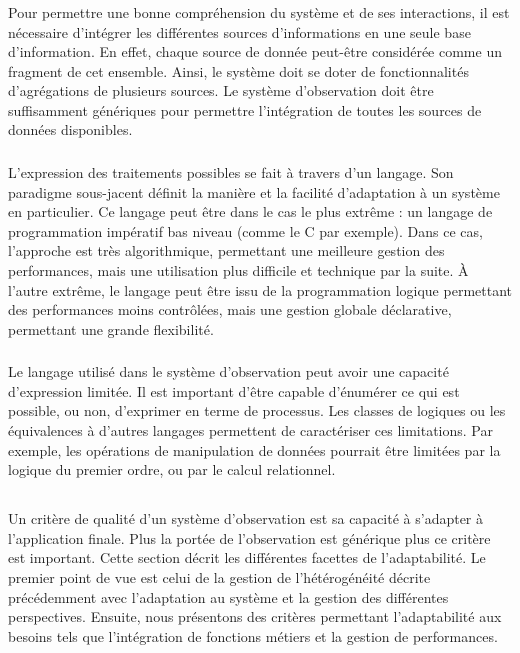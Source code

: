 \subsubsection{\critereBB}
Pour permettre une bonne compréhension du système et de ses interactions, il est nécessaire d'intégrer les différentes sources d'informations en une seule base d'information. En effet, chaque source de donnée peut-être considérée comme un fragment de cet ensemble. Ainsi, le système doit se doter de fonctionnalités d'agrégations de plusieurs sources. Le système d'observation doit être suffisamment génériques pour permettre l'intégration de toutes les sources de données disponibles.

\subsubsection{\critereBC}
L'expression des traitements possibles se fait à travers d'un langage. Son paradigme sous-jacent définit la manière et la facilité d'adaptation à un système en particulier. Ce langage peut être dans le cas le plus extrême : un langage de programmation impératif bas niveau (comme le C par exemple). Dans ce cas, l'approche est très algorithmique, permettant une meilleure gestion des performances, mais une utilisation plus difficile et technique par la suite. À l'autre extrême, le langage peut être issu de la programmation logique permettant des performances moins contrôlées, mais une gestion globale déclarative, permettant une grande flexibilité.

\subsubsection{\critereBD}
Le langage utilisé dans le système d'observation peut avoir une capacité d'expression limitée. Il est important d'être capable d'énumérer ce qui est possible, ou non, d'exprimer en terme de processus. Les classes de logiques ou les équivalences à d'autres langages permettent de caractériser ces limitations. Par exemple, les opérations de manipulation de données pourrait être limitées par la logique du premier ordre, ou par le calcul relationnel.

\subsection{\critereC}
Un critère de qualité d'un système d'observation est sa capacité à s'adapter à l'application finale. Plus la portée de l'observation est générique plus ce critère est important. Cette section décrit les différentes facettes de l'adaptabilité. Le premier point de vue est celui de la gestion de l'hétérogénéité décrite précédemment avec l'adaptation au système et la gestion des différentes perspectives. Ensuite, nous présentons des critères permettant l'adaptabilité aux besoins tels que l'intégration de fonctions métiers et la gestion de performances.

